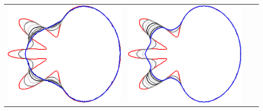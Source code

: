 \begin{frame}
\begin{tabular}{cccc}
\includegraphics[scale=0.13]{figures/non-submodular-elastica/level-effect/flower-l4.png}&
\includegraphics[scale=0.13]{figures/non-submodular-elastica/level-effect/flower-l5.png}
\end{tabular}
\end{frame}

